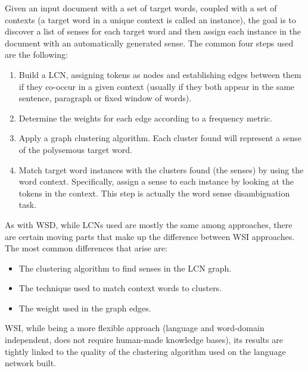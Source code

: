 Given an input document with a set of target words, coupled with a set of contexts (a target word in a unique context is called an instance), the goal is to discover a list of senses for each target word and then assign each instance in the document with an automatically generated sense. The common four steps used are the following:

\begin{enumerate}
\item Build a LCN, assigning tokens as nodes and  establishing edges between them if they co-occur in a given context (usually if they both appear in the same sentence, paragraph or fixed window of words).
\item Determine the weights for each edge according to a frequency metric. 
\item Apply a graph clustering algorithm. Each cluster found will represent a sense of the polysemous target word.
\item Match target word instances with the clusters found (the senses) by using the word context. Specifically, assign a sense to each instance by looking at the tokens in the context. This step is actually the word sense disambiguation task. 
\end{enumerate}	

As with WSD, while  LCNs used are mostly the same among approaches, there are certain moving parts that make up the difference between WSI approaches. The most common differences that   arise are:

\begin{itemize}
\item The clustering algorithm to find senses in the LCN graph.
\item The technique used to match context words to clusters.
\item The weight used in the graph edges.
\end{itemize}


WSI, while being a more flexible approach (language and word-domain independent, does not require human-made knowledge bases), its results are tightly linked to the quality of the clustering algorithm used on the language network built. 
%



